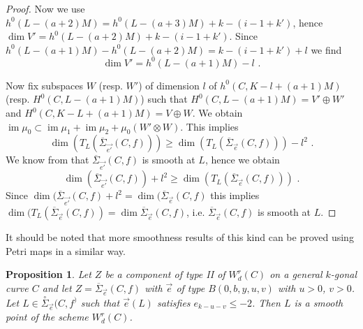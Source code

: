 \documentclass{article}
\DeclareMathOperator{\im}{im}
\newtheorem{proposition}{Proposition}
\theoremstyle{definition}
\theoremstyle{remark}
\begin{document}
\begin{proof}
Now we use $h^0(L-(a+2)M)=h^0(L-(a+3)M)+k-(i-1+k')$, hence $\dim V' = h^0(L-(a+2)M)+k-(i-1+k')$.
Since $h^0(L-(a+1)M)-h^0(L-(a+2)M)=k-(i-1+k')+l$ we find
\[
\dim V' = h^0(L-(a+1)M)-l \text { .}
\]

Now fix subspaces $W$ (resp. $W'$) of dimension $l$ of $h^0(C,K-l+(a+1)M)$ (resp. $H^0(C,L-(a+1)M)$) such that $H^0(C,L-(a+1)M)=V' \oplus W'$ and $H^0(C,K-L+(a+1)M)=V \oplus W$.
We obtain $\im \mu_0 \subset \im \mu_1 + \im \mu_2 + \mu_0 (W' \otimes W)$.
This implies
\[
\dim (T_L(\overline{\Sigma} _{ \overrightarrow{e'}}(C,f))) \geq \dim (T_L (\overline{\Sigma}_{\overrightarrow {e}}(C,f)))-l^2 \text { .}
\]
We know from \cite{ref7} that $\overline{\Sigma}_{\overrightarrow {e'}}(C,f)$ is smooth at $L$, hence we obtain
\[
\dim (\overline{\Sigma}_{\overrightarrow {e'}}(C,f))+l^2 \geq \dim (T_L (\overline{\Sigma}_{\overrightarrow {e}}(C,f))) \text { .}
\]
Since $\dim (\overline{\Sigma}_{\overrightarrow {e'}}(C,f)+l^2 =\dim (\overline{\Sigma}_{\overrightarrow {e}}(C,f)$ this implies $\dim (T_L (\overline{\Sigma} _{\overrightarrow {e}}(C,f))=\dim \overline{\Sigma}_{\overrightarrow {e}}(C,f)$, i.e. $\overline {\Sigma }_{\overrightarrow {e}}(C,f)$ is smooth at $L$.
\end{proof}

It should be noted that more smoothness results of this kind can be proved using Petri maps in a similar way.

\begin{proposition}\label{propE1}
Let $Z$ be a component of type II of $W^r_d(C)$ on a general $k$-gonal curve $C$ and let $Z=\overline{\Sigma}_{\overrightarrow {e}}(C,f)$ with $\overrightarrow {e}$ of type $B(0,b,y,u,v)$ with $u>0$, $v>0$.
Let $L \in \overset {\circ}{\Sigma}_{\overrightarrow {e}}(C,f^)$ such that $\overrightarrow {e}(L)$ satisfies $e_{k-u-v} \leq -2$.
Then $L$ is a smooth point of the scheme $W^r_d(C)$.
\end{proposition}
\end{document}
